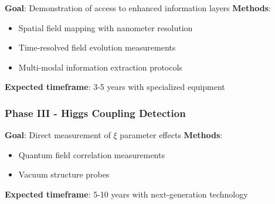 	\textbf{Goal}: Demonstration of access to enhanced information layers
	\textbf{Methods}:
	\begin{itemize}
		\item Spatial field mapping with nanometer resolution
		\item Time-resolved field evolution measurements
		\item Multi-modal information extraction protocols
	\end{itemize}
	\textbf{Expected timeframe}: 3-5 years with specialized equipment
	
	\subsubsection{Phase III - Higgs Coupling Detection}
	
	\textbf{Goal}: Direct measurement of $\xi$ parameter effects
	\textbf{Methods}:
	\begin{itemize}
		\item Quantum field correlation measurements
		\item Vacuum structure probes
	\end{itemize}
	\textbf{Expected timeframe}: 5-10 years with next-generation technology
	